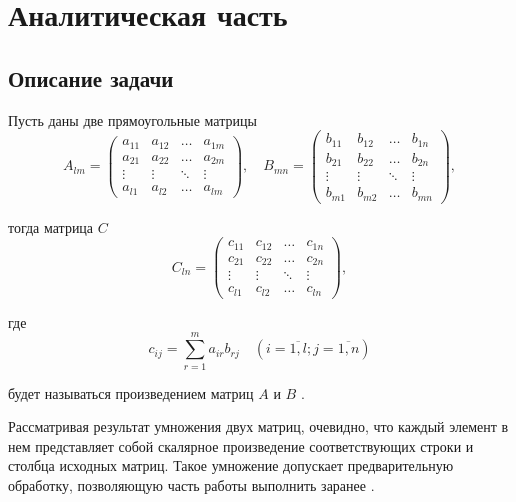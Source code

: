\chapter{Аналитическая часть}

\section{Описание задачи}


Пусть даны две прямоугольные матрицы
\begin{equation}
	A_{lm} = \begin{pmatrix}
		a_{11} & a_{12} & \ldots & a_{1m}\\
		a_{21} & a_{22} & \ldots & a_{2m}\\
		\vdots & \vdots & \ddots & \vdots\\
		a_{l1} & a_{l2} & \ldots & a_{lm}
	\end{pmatrix},
	\quad
	B_{mn} = \begin{pmatrix}
		b_{11} & b_{12} & \ldots & b_{1n}\\
		b_{21} & b_{22} & \ldots & b_{2n}\\
		\vdots & \vdots & \ddots & \vdots\\
		b_{m1} & b_{m2} & \ldots & b_{mn}
	\end{pmatrix},
\end{equation}

тогда матрица $C$
\begin{equation}
	C_{ln} = \begin{pmatrix}
		c_{11} & c_{12} & \ldots & c_{1n}\\
		c_{21} & c_{22} & \ldots & c_{2n}\\
		\vdots & \vdots & \ddots & \vdots\\
		c_{l1} & c_{l2} & \ldots & c_{ln}
	\end{pmatrix},
\end{equation}

где
\begin{equation}
	\label{eq:M}
	c_{ij} =
	\sum_{r=1}^{m} a_{ir}b_{rj} \quad (i=\overline{1,l}; j=\overline{1,n})
\end{equation}

будет называться произведением матриц $A$ и $B$ \cite{Cohn}.

Рассматривая результат умножения двух матриц, очевидно, что каждый элемент в нем представляет собой скалярное произведение соответствующих строки и столбца исходных матриц.
Такое умножение допускает предварительную обработку, позволяющую часть работы выполнить заранее \cite{Coppersmith}.


